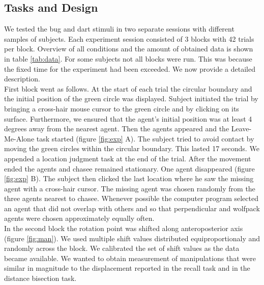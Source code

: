 \documentclass[10pt]{article}
\begin{document}
\subsection*{Tasks and Design}
We tested the bug and dart stimuli in two separate sessions with different samples of subjects. 
Each experiment session consisted of 3 blocks with 42 trials per block.  
Overview of all conditions and the amount of obtained data is shown in table \ref{tab:data}. For some subjects not all blocks were run. This was  because the fixed time for the experiment had been exceeded. 
We now provide a detailed description. \\
First block went as follows. 
At the start of each trial the circular boundary and the initial position of the green circle was displayed. 
Subject initiated the trial by bringing a cross-hair mouse cursor to the green circle and by clicking on its surface. 
Furthermore, we ensured that the agent's initial position was at least 4 degrees away from the nearest agent. 
Then the agents appeared and the Leave-Me-Alone task started (figure \ref{fig:exp} A). The subject tried to avoid contact by moving the green circles within the circular boundary. 
This lasted 17 seconds. 
We appended a location judgment task at the end of the trial. 
After the movement ended the agents and chasee remained stationary. 
One agent disappeared (figure \ref{fig:exp} B). 
The subject then clicked the last location where he saw the missing agent with a cross-hair cursor. 
The missing agent was chosen randomly from the three agents nearest to chasee. 
Whenever possible the computer program selected an agent that did not overlap with others and so that perpendicular and wolfpack agents were chosen approximately equally often. \\
In the second block the rotation point was shifted along anteroposterior axis (figure \ref{fig:man}). 
We used multiple shift values distributed equiproportionaly and randomly across the block. 
We calibrated the set of shift values as the data became available. 
We wanted to obtain measurement of manipulations that were similar in magnitude to the displacement reported in the recall task and in the distance bisection task. 
\end{document}
